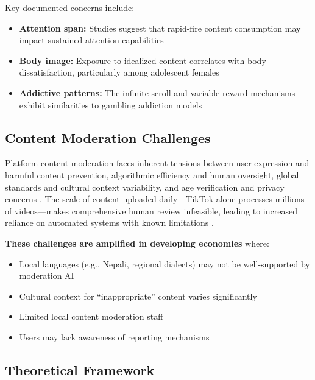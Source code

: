 \documentclass[11pt,a4paper]{article}
\begin{document}
Key documented concerns include:

\begin{itemize}[leftmargin=*, itemsep=0.3em]
    \item \textbf{Attention span:} Studies suggest that rapid-fire content consumption may impact sustained attention capabilities \citep{su2021fmri}
    \item \textbf{Body image:} Exposure to idealized content correlates with body dissatisfaction, particularly among adolescent females \citep{fardouly2022social, tiggemann2018media}
    \item \textbf{Addictive patterns:} The infinite scroll and variable reward mechanisms exhibit similarities to gambling addiction models \citep{montag2021addictive, andreassen2016bergen}
\end{itemize}

\subsection{Content Moderation Challenges}

Platform content moderation faces inherent tensions between user expression and harmful content prevention, algorithmic efficiency and human oversight, global standards and cultural context variability, and age verification and privacy concerns \citep{gillespie2018custodians}. The scale of content uploaded daily---TikTok alone processes millions of videos---makes comprehensive human review infeasible, leading to increased reliance on automated systems with known limitations \citep{gorwa2020algorithmic}.

\textbf{These challenges are amplified in developing economies} where:
\begin{itemize}[itemsep=0.2em]
    \item Local languages (e.g., Nepali, regional dialects) may not be well-supported by moderation AI
    \item Cultural context for ``inappropriate'' content varies significantly
    \item Limited local content moderation staff
    \item Users may lack awareness of reporting mechanisms
\end{itemize}

\subsection{Theoretical Framework}
\end{document}
